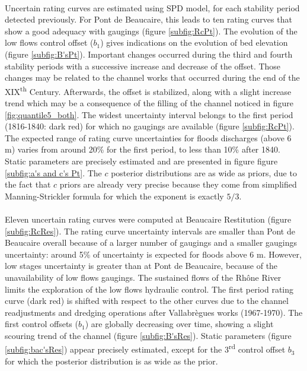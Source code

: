 \documentclass[11pt]{article}
\begin{document}
    \paragraph{}
    Uncertain rating curves are estimated using \citet{mansanarez_shift_2019} SPD model, for each stability period detected previously. For Pont de Beaucaire, this leads to ten rating curves that show a good adequacy with gaugings (figure \ref{subfig:RcPt}). The evolution of the low flows control offset ($b_1$) gives indications on the evolution of bed elevation (figure \ref{subfig:B'sPt}). Important changes occurred during the third and fourth stability periods with a successive increase and decrease of the offset. Those changes may be related to the channel works that occurred during the end of the XIX\textsuperscript{th} Century. Afterwards, the offset is stabilized, along with a slight increase trend which may be a consequence of the filling of the channel noticed in figure \ref{fig:quantile5_both}. The widest uncertainty interval belongs to the first period (1816-1840: dark red) for which no gaugings are available (figure \ref{subfig:RcPt}). The expected range of rating curve uncertainties for floods discharges (above 6 m) varies from around 20\% for the first period, to less than 10\% after 1840. Static parameters are precisely estimated and are presented in figure figure \ref{subfig:a's and c's Pt}. The $c$ posterior distributions are as wide as priors, due to the fact that $c$ priors are already very precise because they come from simplified Manning-Strickler formula for which the exponent is exactly $5/3$.
    
    \paragraph{}
    Eleven uncertain rating curves were computed at Beaucaire Restitution (figure \ref{subfig:RcRes}). The rating curve uncertainty intervals are smaller than Pont de Beaucaire overall because of a larger number of gaugings and a smaller gaugings uncertainty: around 5\% of uncertainty is expected for floods above 6 m. However, low stages uncertainty is greater than at Pont de Beaucaire, because of the unavailability of low flows gaugings. The sustained flows of the Rhône River limits the exploration of the low flows hydraulic control.
    The first period rating curve (dark red) is shifted with respect to the other curves due to the channel readjustments and dredging operations after Vallabrègues works (1967-1970). The first control offsets ($b_1$) are globally decreasing over time, showing a slight scouring trend of the channel (figure \ref{subfig:B'sRes}). Static parameters (figure \ref{subfig:bac'sRes}) appear precisely estimated, except for the 3\textsuperscript{rd} control offset $b_3$ for which the posterior distribution is as wide as the prior. 
    
\end{document}
